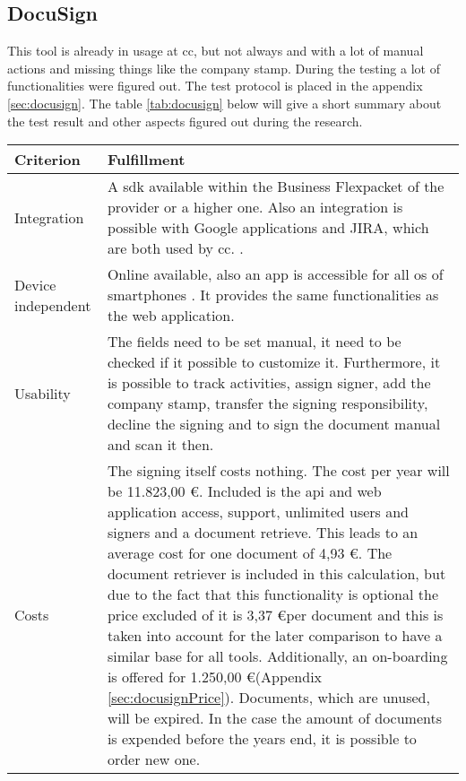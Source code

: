 \subsection{DocuSign}
This tool is already in usage at \gls{cc}, but not always and with a lot of manual actions and missing things like the company stamp. During the testing a lot of functionalities were figured out. The test protocol is placed in the appendix \ref{sec:docusign}. The table \ref{tab:docusign} below will give a short summary about the test result and other aspects figured out during the research.

	
	\begin{longtable}{|p{4cm}|p{10cm}|} \hline
		\rowcolor{Gray}Criterion & Fulfillment \\ \hline
		Integration &  A \gls{sdk} available within the \grqq Business Flex\grqq packet of the provider or a higher one. Also an integration is possible with Google applications and JIRA, which are both used by \gls{cc}. \parencite{docusign2018integration,docusign2018formats,docusign2018google,docusign2018jira}. \\ \hline
		Device independent & Online available, also an \gls{app} is accessible for all \gls{os} of smartphones \parencite{docusign2018mobile}. It provides the same functionalities as the web application. \\ \hline
		Usability &  The fields need to be set manual, it need to be checked if it possible to customize it. Furthermore, it is possible to track activities, assign signer, add the company stamp, transfer the signing responsibility, decline the signing and to sign the document manual and scan it then. \\ \hline
		Costs & The signing itself costs nothing. The cost per year will be 11.823,00 \euro. Included is the \gls{api} and web application access, support, unlimited users and signers and a document retrieve. This leads to an average cost for one document of 4,93 \euro. The document retriever is included in this calculation, but due to the fact that this functionality is optional the price excluded of it is 3,37 \euro per document and this is taken into account for the later comparison to have a similar base for all tools. Additionally, an on-boarding is offered for 1.250,00 \euro (Appendix \ref{sec:docusignPrice}). Documents, which are unused, will be expired. In the case the amount of documents is expended before the years end, it is possible to order new one. \\ \hline

\end{longtable}
